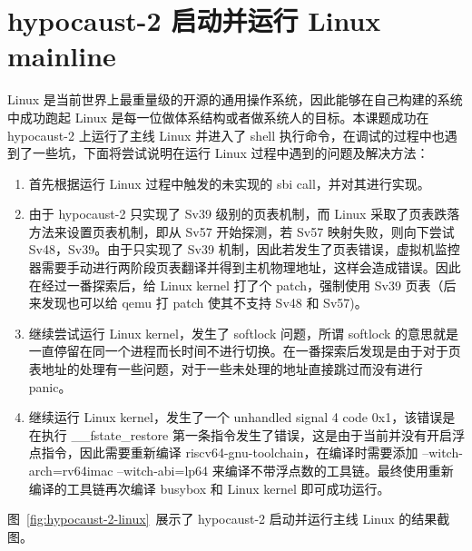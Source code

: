 \section{hypocaust-2 启动并运行 Linux mainline}
Linux 是当前世界上最重量级的开源的通用操作系统，因此能够在自己构建的系统中成功跑起 Linux 是每一位做体系结构或者做系统人的目标。本课题成功在 hypocaust-2 上运行了主线 Linux 并进入了 shell 执行命令，在调试的过程中也遇到了一些坑，下面将尝试说明在运行 Linux 过程中遇到的问题及解决方法：
\begin{enumerate}
    \item 首先根据运行 Linux 过程中触发的未实现的 sbi call，并对其进行实现。
    \item 由于 hypocaust-2 只实现了 Sv39 级别的页表机制，而 Linux 采取了页表跌落方法来设置页表机制，即从 Sv57 开始探测，若 Sv57 映射失败，则向下尝试 Sv48，Sv39。由于只实现了 Sv39 机制，因此若发生了页表错误，虚拟机监控器需要手动进行两阶段页表翻译并得到主机物理地址，这样会造成错误。因此在经过一番探索后，给 Linux kernel 打了个 patch，强制使用 Sv39 页表（后来发现也可以给 qemu 打 patch 使其不支持 Sv48 和 Sv57)。
    \item 继续尝试运行 Linux kernel，发生了 softlock 问题，所谓 softlock 的意思就是一直停留在同一个进程而长时间不进行切换。在一番探索后发现是由于对于页表地址的处理有一些问题，对于一些未处理的地址直接跳过而没有进行 panic。
    \item 继续运行 Linux kernel，发生了一个 unhandled signal 4 code 0x1，该错误是在执行 \_\_fstate\_restore 第一条指令发生了错误，这是由于当前并没有开启浮点指令，因此需要重新编译 riscv64-gnu-toolchain，在编译时需要添加 --witch-arch=rv64imac --witch-abi=lp64 来编译不带浮点数的工具链。最终使用重新编译的工具链再次编译 busybox 和 Linux kernel 即可成功运行。
\end{enumerate}

图~\ref{fig:hypocaust-2-linux}~展示了 hypocaust-2 启动并运行主线 Linux 的结果截图。

